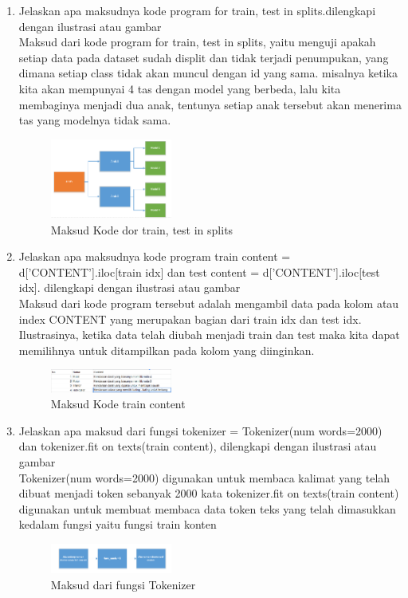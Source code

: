\begin{enumerate}
\item Jelaskan apa maksudnya kode program for train, test in splits.dilengkapi dengan ilustrasi atau gambar\\
Maksud dari kode program for train, test in splits, yaitu menguji apakah setiap data pada dataset sudah displit dan tidak terjadi penumpukan, yang dimana setiap class tidak akan muncul dengan id yang sama. misalnya ketika kita akan mempunyai 4 tas dengan model yang berbeda, lalu kita membaginya menjadi dua anak, tentunya setiap anak tersebut akan menerima tas yang modelnya tidak sama.
\hfill\break
	\begin{figure}[H]
		\includegraphics[width=4cm]{figures/1174054/7/3.png}
		\centering
		\caption{Maksud Kode dor train, test in splits}
	\end{figure}

\item Jelaskan apa maksudnya kode program train content = d[’CONTENT’].iloc[train idx] dan test content = d[’CONTENT’].iloc[test idx]. dilengkapi dengan ilustrasi atau gambar\\
Maksud dari kode program tersebut adalah mengambil data pada kolom atau index CONTENT yang merupakan bagian dari train idx dan test idx. Ilustrasinya, ketika data telah diubah menjadi train dan test maka kita dapat memilihnya untuk ditampilkan pada kolom yang diinginkan.
\hfill\break
	\begin{figure}[H]
		\includegraphics[width=4cm]{figures/1174054/7/4.png}
		\centering
		\caption{Maksud Kode train content}
	\end{figure}

\item Jelaskan apa maksud dari fungsi tokenizer = Tokenizer(num words=2000) dan tokenizer.fit on texts(train content), dilengkapi dengan ilustrasi atau gambar\\
Tokenizer(num words=2000) digunakan untuk membaca kalimat yang telah dibuat menjadi token sebanyak 2000 kata
tokenizer.fit on texts(train content) digunakan untuk membuat membaca data token teks yang telah dimasukkan kedalam fungsi yaitu fungsi train konten
\hfill\break
	\begin{figure}[H]
		\includegraphics[width=4cm]{figures/1174054/7/5.png}
		\centering
		\caption{Maksud dari fungsi Tokenizer}
	\end{figure}


\end{enumerate}
